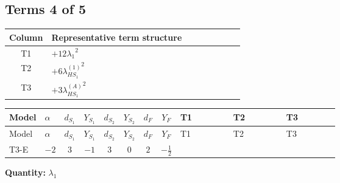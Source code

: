 \documentclass[8pt]{article}
\begin{document}
\begin{landscape}
\subsection*{Terms 4 of 5}
\begin{center}
\begin{tabular}{@{}c >{\raggedright\arraybackslash}p{0.82\linewidth}@{}}
\toprule
Column & Representative term structure \\
\midrule
T1 & \(\displaystyle +12 {\lambda_1}^2\) \\
\midrule
T2 & \(\displaystyle +6 {\lambda_{HS_1}^{(1)}}^2\) \\
\midrule
T3 & \(\displaystyle +3 {\lambda_{HS_1}^{(A)}}^2\) \\
\midrule
\bottomrule
\end{tabular}
\end{center}
\smallskip
\tiny
\begin{longtable}{@{}llcccccc >{\raggedright\arraybackslash}p{0.21\linewidth} >{\raggedright\arraybackslash}p{0.21\linewidth} >{\raggedright\arraybackslash}p{0.21\linewidth}@{}}
\toprule
Model & $\alpha$ & $d_{S_1}$ & $Y_{S_1}$ & $d_{S_2}$ & $Y_{S_2}$ & $d_F$ & $Y_F$ & T1 & T2 & T3 \\
\midrule
\endfirsthead
\toprule
Model & $\alpha$ & $d_{S_1}$ & $Y_{S_1}$ & $d_{S_2}$ & $Y_{S_2}$ & $d_F$ & $Y_F$ & T1 & T2 & T3 \\
\midrule
\endhead
T3-E & $-2$ & $3$ & $-1$ & $3$ & $0$ & $2$ & $-\frac{1}{2}$ & \scriptsize\adjustbox{max width=\linewidth}{$\begin{gathered} +12 {\lambda_1}^2\end{gathered}$} & \scriptsize\adjustbox{max width=\linewidth}{$\begin{gathered} +6 {\lambda_{HS_1}^{(1)}}^2\end{gathered}$} & \scriptsize\adjustbox{max width=\linewidth}{$\begin{gathered} +3 {\lambda_{HS_1}^{(A)}}^2\end{gathered}$} \\
\midrule
\bottomrule
\end{longtable}
\clearpage
\noindent\textbf{Quantity: }$\lambda_1$\par\smallskip

\end{landscape}
\end{document}
